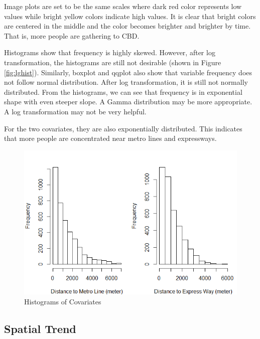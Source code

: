 \documentclass[hidelinks,12pt]{article}
\begin{document}
	Image plots are set to be the same scales where dark red color represents low values while bright yellow colors indicate high values. It is clear that bright colors are centered in the middle and the color becomes brighter and brighter by time. That is, more people are gathering to CBD.
	
	Histograms show that frequency is highly skewed. However, after log transformation, the histograms are still not desirable (shown in Figure \ref{fig:lghist}). Similarly, boxplot and qqplot also show that variable frequency does not follow normal distribution. After log transformation, it is still not normally distributed. From the histograms, we can see that frequency is in exponential shape with even steeper slope. A Gamma distribution may be more appropriate. A log transformation may not be very helpful.
	
	For the two covariates, they are also exponentially distributed. This indicates that more people are concentrated near metro lines and expressways.
	\begin{figure}[!ht]
		\includegraphics[width=\textwidth]{hist_x.png}
		\caption{Histograms of Covariates \label{fig:histx}}
	\end{figure}
\FloatBarrier

	\subsection{Spatial Trend}\label{sec:spatialtrend}
	
\end{document}

